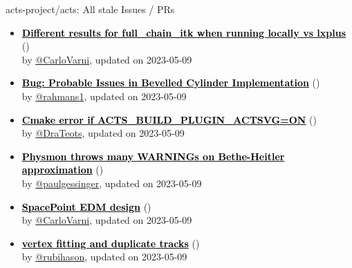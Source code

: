 \begin{frame}[allowframebreaks]{ acts-project/acts: All stale Issues / PRs}
\begin{itemize}
    \item\iss\prstale\textbf{\href{https://github.com/acts-project/acts/issues/1819}{\textcolor{black}{Different results for full\_chain\_itk when running locally vs lxplus}}}
    (\href{https://github.com/acts-project/acts/issues/1819}{}) \\
    by \href{https://github.com/CarloVarni}{@CarloVarni}, updated on 2023-05-09

    \item\iss\prstale\textbf{\href{https://github.com/acts-project/acts/issues/1238}{\textcolor{black}{Bug: Probable Issues in Bevelled Cylinder Implementation}}}
    (\href{https://github.com/acts-project/acts/issues/1238}{}) \\
    by \href{https://github.com/rahmans1}{@rahmans1}, updated on 2023-05-09

    \item\iss\prstale\textbf{\href{https://github.com/acts-project/acts/issues/1818}{\textcolor{black}{Cmake error if ACTS\_BUILD\_PLUGIN\_ACTSVG=ON}}}
    (\href{https://github.com/acts-project/acts/issues/1818}{}) \\
    by \href{https://github.com/DraTeots}{@DraTeots}, updated on 2023-05-09

    \item\iss\prstale\textbf{\href{https://github.com/acts-project/acts/issues/1748}{\textcolor{black}{Physmon throws many WARNINGs on Bethe-Heitler approximation}}}
    (\href{https://github.com/acts-project/acts/issues/1748}{}) \\
    by \href{https://github.com/paulgessinger}{@paulgessinger}, updated on 2023-05-09

    \item\iss\prstale\textbf{\href{https://github.com/acts-project/acts/issues/1971}{\textcolor{black}{SpacePoint EDM design}}}
    (\href{https://github.com/acts-project/acts/issues/1971}{}) \\
    by \href{https://github.com/CarloVarni}{@CarloVarni}, updated on 2023-05-09

    \item\iss\prstale\textbf{\href{https://github.com/acts-project/acts/issues/1992}{\textcolor{black}{vertex fitting and duplicate tracks}}}
    (\href{https://github.com/acts-project/acts/issues/1992}{}) \\
    by \href{https://github.com/rubihason}{@rubihason}, updated on 2023-05-09


\end{itemize}
\end{frame}
